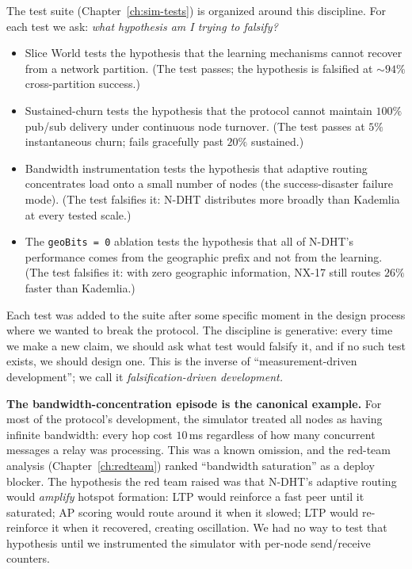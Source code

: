 \documentclass[twoside,nobib]{tufte-book}
\newcommand{\NDHT}{N-DHT\xspace}
\begin{document}
The test suite (Chapter~\ref{ch:sim-tests}) is organized around
this discipline. For each test we ask: \emph{what hypothesis am
I trying to falsify?}

\begin{itemize}\setlength\itemsep{0.2em}
  \item Slice World tests the hypothesis that the learning
    mechanisms cannot recover from a network partition. (The
    test passes; the hypothesis is falsified at $\sim 94\%$
    cross-partition success.)
  \item Sustained-churn tests the hypothesis that the protocol
    cannot maintain $100\%$ pub/sub delivery under continuous
    node turnover. (The test passes at $5\%$ instantaneous churn;
    fails gracefully past $20\%$ sustained.)
  \item Bandwidth instrumentation tests the hypothesis that
    adaptive routing concentrates load onto a small number of
    nodes (the success-disaster failure mode). (The test
    falsifies it: \NDHT distributes more broadly than Kademlia
    at every tested scale.)
  \item The \texttt{geoBits = 0} ablation tests the hypothesis
    that all of \NDHT's performance comes from the geographic
    prefix and not from the learning. (The test falsifies it:
    with zero geographic information, NX-17 still routes $26\%$
    faster than Kademlia.)
\end{itemize}

Each test was added to the suite after some specific moment in
the design process where we wanted to break the protocol. The
discipline is generative: every time we make a new claim, we
should ask what test would falsify it, and if no such test
exists, we should design one. This is the inverse of
``measurement-driven development''; we call it
\emph{falsification-driven development.}

\textbf{The bandwidth-concentration episode is the canonical
example.} For most of the protocol's development, the simulator
treated all nodes as having infinite bandwidth: every hop cost
$10$\,ms regardless of how many concurrent messages a relay was
processing. This was a known omission, and the red-team analysis
(Chapter~\ref{ch:redteam}) ranked ``bandwidth saturation'' as a
deploy blocker. The hypothesis the red team raised was that
\NDHT's adaptive routing would \emph{amplify} hotspot formation:
LTP would reinforce a fast peer until it saturated; AP scoring
would route around it when it slowed; LTP would re-reinforce it
when it recovered, creating oscillation. We had no way to
test that hypothesis until we instrumented the simulator with
per-node send/receive counters.
\end{document}
